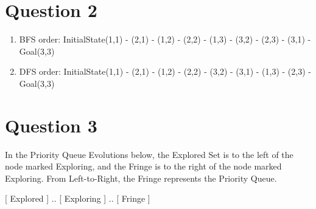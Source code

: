 \documentclass{article}
\begin{document}
    \newpage
    \section*{Question 2}
    \begin{enumerate}
        \item BFS order: 
        \newline
        InitialState(1,1) - (2,1) - (1,2) - (2,2) - (1,3) - (3,2) - (2,3) - (3,1) - Goal(3,3) 
        \item DFS order: 
        \newline
        InitialState(1,1) - (2,1) - (1,2) - (2,2) - (3,2) - (3,1) - (1,3) - (2,3) - Goal(3,3)
    \end{enumerate}

    \newpage
    \section*{Question 3}
    
    In the Priority Queue Evolutions below, the Explored Set is to the left of the node marked Exploring, and the Fringe is to the right of the node marked Exploring. From Left-to-Right, the Fringe represents the Priority Queue.
    
    [ Explored ] .. [ Exploring ] .. [ Fringe ]
    
\end{document}
